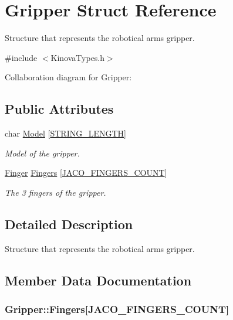 \hypertarget{struct_gripper}{}\section{Gripper Struct Reference}
\label{struct_gripper}


Structure that represents the robotical arm\textquotesingle{}s gripper.  




{\ttfamily \#include $<$Kinova\+Types.\+h$>$}



Collaboration diagram for Gripper\+:
\subsection*{Public Attributes}
\begin{DoxyCompactItemize}
\item 
char \hyperlink{struct_gripper_aa3b78dc0d3f43e0237049b9c99152cd0}{Model} \mbox{[}\hyperlink{_kinova_types_8h_ac829415013d8120cedee928452ae0f55}{S\+T\+R\+I\+N\+G\+\_\+\+L\+E\+N\+G\+TH}\mbox{]}
\begin{DoxyCompactList}\small\item\em Model of the gripper. \end{DoxyCompactList}\item 
\hyperlink{struct_finger}{Finger} \hyperlink{struct_gripper_a29c6c24f466f89ca91df7c47b5fdb7d3}{Fingers} \mbox{[}\hyperlink{_kinova_types_8h_a36c985755b11a97dc5ba1ecc41e3ed37}{J\+A\+C\+O\+\_\+\+F\+I\+N\+G\+E\+R\+S\+\_\+\+C\+O\+U\+NT}\mbox{]}
\begin{DoxyCompactList}\small\item\em The 3 fingers of the gripper. \end{DoxyCompactList}\end{DoxyCompactItemize}


\subsection{Detailed Description}
Structure that represents the robotical arm\textquotesingle{}s gripper. 

\subsection{Member Data Documentation}
\subsubsection[{\texorpdfstring{Fingers}{Fingers}}]{ Gripper\+::\+Fingers\mbox{[}{\bf J\+A\+C\+O\+\_\+\+F\+I\+N\+G\+E\+R\+S\+\_\+\+C\+O\+U\+NT}\mbox{]}}\hypertarget{struct_gripper_a29c6c24f466f89ca91df7c47b5fdb7d3}{}\label{struct_gripper_a29c6c24f466f89ca91df7c47b5fdb7d3}


